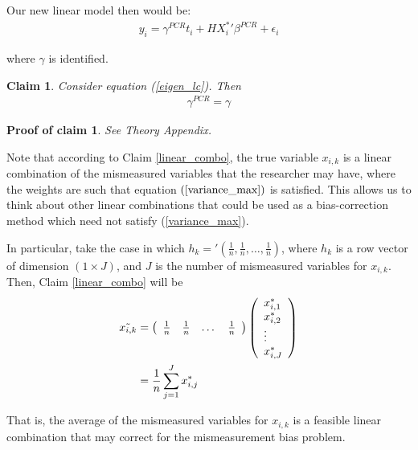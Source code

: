 \documentclass[10pt]{article}
\newtheorem{claim}{Claim}
\newtheorem{claimproof}{Proof of claim}[claim]
\begin{document}
        Our new linear model then would be:
        \begin{align} \label{eigen_lc}
            y_i = \gamma^{PCR} t_i + H{X^*_i}'\beta^{PCR} + \epsilon_i
        \end{align}
        
        where $\gamma$ is identified.

        \begin{claim}
        Consider equation (\ref{eigen_lc}). Then
            \begin{align}
                {\gamma}^{PCR} = \gamma
            \end{align}
        \end{claim}

        \begin{claimproof}
            See Theory Appendix.
        \end{claimproof}
        
        Note that according to Claim \ref{linear_combo}, the true variable $x_{i,k}$ is a linear combination of the mismeasured variables that the researcher may have, where the weights are such that equation $(\ref{variance_max})$ is satisfied. This allows us to think about other linear combinations that could be used as a bias-correction method which need not satisfy (\ref{variance_max}). 
        
        In particular, take the case in which $h_k='(\frac{1}{n},\frac{1}{n},\dots,\frac{1}{n})$, where $h_k$ is a row vector of dimension $(1\times J)$, and $J$ is the number of mismeasured variables for $x_{i,k}$. Then, Claim \ref{linear_combo} will be
        \begin{align}
            \Tilde{x_{i,k}}&=\left(\begin{array}{cccc}
            \frac{1}{n} & \frac{1}{n} & \dots &\frac{1}{n} 
            \end{array}\right)\left(\begin{array}{l}
            x^*_{i,1} \\
            x^*_{i,2} \\
            \vdots \\
            x^*_{i,J} 
            \end{array}\right)\\
            &=\frac{1}{n}\sum_{j=1}^J x^*_{i,j}
        \end{align}
        
        That is, the average of the mismeasured variables for $x_{i,k}$ is a feasible linear combination that may correct for the mismeasurement bias problem.
\end{document}

